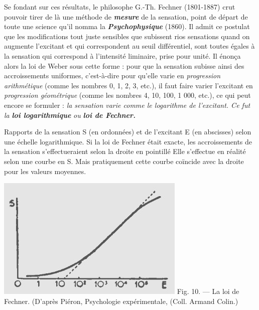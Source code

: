 Se fondant sur ces résultats, le philosophe G.-Th. Fechner (1801-1887)
crut pouvoir tirer de là une méthode de \textbf{\textit {mesure}} de la sensation,
point de départ de toute une science qu’il nomma la \textbf{\textit {Psychophysique}}
(1860). Il admit ce postulat que les modifications tout juste sensibles
que subissent rios sensations quand on augmente l’excitant et qui
correspondent au seuil différentiel, sont toutes égales à la sensation
qui correspond à l'intensité liminaire, prise pour unité. Il énonça
alors la loi de Weber sous cette forme : pour que la sensation subisse
ainsi des accroissements uniformes, c’est-à-dire pour qu’elle varie
en {\it progression arithmétique} (comme les nombres 0, 1, 2, 3, etc.), il
faut faire varier l’excitant en {\it progression géométrique} (comme les
nombres 4, 10, 100, 1 000, etc.), ce qui peut encore se formuler : {\it la
sensation varie comme le logarithme de l’excitant. Ce fut la} \textbf{\textit {loi
logarithmique}} {\it ou} \textbf{\textit {loi de Fechner.}}

\begin{minipage}[c]{.45\linewidth}
Rapports de la sensation S (en ordonnées)  et de l'excitant E (en abscisses) selon 
une échelle logarithmique. Si la loi de Fechner était exacte, les accroissements 
de la sensation s'effectueraient selon la droite en pointillé Elle s'effectue en 
réalité selon une courbe en S. Mais pratiquement cette courbe coïncide avec  
la droite pour les valeurs moyennes. 
\end{minipage}
\hfill
\begin{minipage}[c]{.45\linewidth}
\begin{center}
\includegraphics[scale=0.6]{./05_sensible/010}
Fig. 10. — La loi de Fechner.
(D'après Piéron, Psychologie expérimentale, (Coll. Armand Colin.)
\end{center}
\end{minipage}

